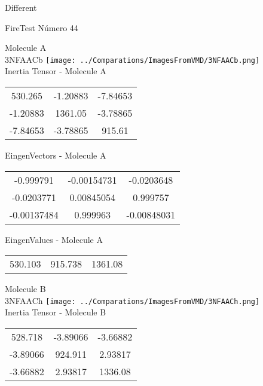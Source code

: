 \begin{center}
\vtab
\vtab
\textcolor{NavyBlue}{\Large Different}
\end{center}

 \newpage

\vtab[-2cm]
\begin{center}
{\large FireTest \tab Número 44}
\end{center}
\begin{multicols}{2}
\begin{center}

Molecule A \\ 
3NFAACb
\texttt{[image: ../Comparations/ImagesFromVMD/3NFAACb.png]}
\\
Inertia Tensor - Molecule A \\
\vtab

\begin{tabular}{|c c c|}
530.265	 & 	-1.20883	 & 	-7.84653	 \\
-1.20883	 & 	1361.05	 & 	-3.78865	 \\
-7.84653	 & 	-3.78865	 & 	915.61
\end{tabular}

\vtab
 EingenVectors - Molecule A     \\
\vtab
\begin{tabular}{|c c c|}
-0.999791	 & 	-0.00154731	 & 	-0.0203648	 \\
-0.0203771	 & 	0.00845054	 & 	0.999757	 \\
-0.00137484	 & 	0.999963	 & 	-0.00848031
\end{tabular}

\vtab
 EingenValues - Molecule A     \\
\vtab
\begin{tabular}{|c c c|}
530.103	 & 	915.738	 & 	1361.08	 \\
\end{tabular}
\columnbreak

Molecule B \\ 
3NFAACh
\texttt{[image: ../Comparations/ImagesFromVMD/3NFAACh.png]}
\\
Inertia Tensor - Molecule B \\
\vtab

\begin{tabular}{|c c c|}
528.718	 & 	-3.89066	 & 	-3.66882	 \\
-3.89066	 & 	924.911	 & 	2.93817	 \\
-3.66882	 & 	2.93817	 & 	1336.08
\end{tabular}


\end{center}
\end{multicols}
